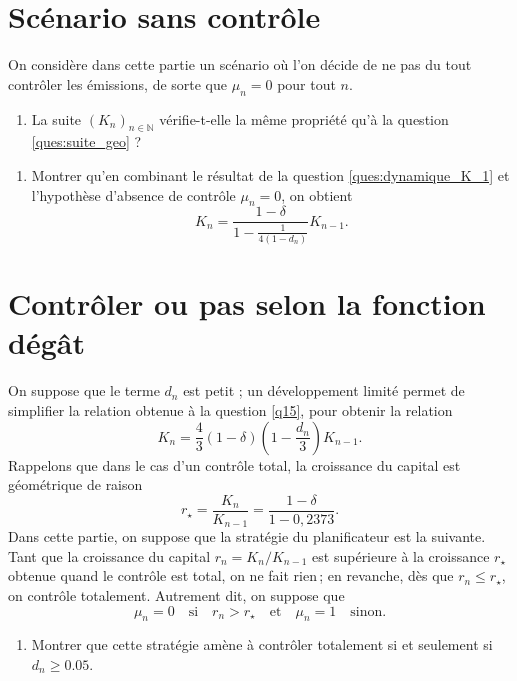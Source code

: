 \documentclass[12pt,a4paper]{article}
\newcommand{\ques}[1]{\begin{enumerate}[resume]
\item  #1
\end{enumerate}}
\newcommand{\rep}[1]{\textit{Réponse :} #1 \\}
\renewcommand{\rep}[1]{ }
\theoremstyle{remark}
\def\NN{\mathbb{N}}
\begin{document}
{\section*{\sc Scénario sans contrôle}
On considère dans cette partie un scénario où l'on décide de ne pas du tout contrôler les émissions, de sorte que $\mu_n=0$ pour tout $n$.
\ques{La suite $(K_n)_{n\in \NN}$ vérifie-t-elle la même propriété qu'à la question \ref{ques:suite_geo} ?}
\rep{Non, dans ce cas la suite $(T_n)_{n\in \NN}$, et donc la suite $(\Omega_n)_{n\in \NN}$, n'est pas constante et dépend de $(K_n)_{n\in \NN}$. La suite $(K_n)_{n\in \NN}$ n'est donc pas géométrique.}


\ques{\label{q15}Montrer qu'en combinant le résultat de la question \ref{ques:dynamique_K_1} et l'hypothèse d'absence de contrôle $\mu_n =0$, on obtient
\begin{equation*} 
K_n=\frac{1- \delta}{1- \frac{1}{4(1-d_n)}} K_{n-1}.\end{equation*}
\label{ques:dynamique_K_3}
}

\section*{\sc Contrôler ou pas selon la fonction dégât}

On suppose que le terme $d_n$ est petit ; un développement limité permet de simplifier la relation obtenue à la question \ref{q15}, pour obtenir la relation
\begin{equation*} 
K_n=\frac{4}{3}(1- \delta)\left(1-\frac{d_n}{3}\right) K_{n-1}.
\end{equation*}
Rappelons que dans le cas d'un contrôle total, la croissance du capital est géométrique de raison 
$$
r_\star = \frac{K_n}{K_{n-1}} = \frac{1- \delta}{1- 0,2373}.
$$
Dans cette partie, on suppose que la stratégie du planificateur est la suivante. Tant que la croissance du capital $r_n = K_n / K_{n-1}$ est supérieure à la croissance $r_\star$ obtenue quand le contrôle est total, on ne fait rien$\,$; en revanche, dès que $r_n \leqslant r_\star$, on contrôle totalement. Autrement dit, on suppose que
$$
 \mu_n = 0 \quad \text{si} \quad r_n > r_\star \quad \text{et} \quad \mu_n = 1 \quad \text{sinon.}
$$

\ques{Montrer que cette stratégie amène à contrôler totalement si et seulement si $d_n \geqslant 0.05.$}
\rep{On choisit de contrôler les émissions lorsque le facteur multiplicatif du scénario contrôlé est supérieur au scénario non contrôlé :
\begin{equation*}
\begin{aligned}
&(1-\delta)\frac{4}{3}\left(1-\frac{d_n}{3}\right) < \frac{1-\delta}{1-0,2373} \\
\text{ssi} \quad &1-\frac{d_n}{3} < \frac{3}{4}\times \frac{1}{0,7627} \\
\text{ssi} \quad &0,05 = 3-\frac{9}{4 \times 0,7627} < d_n
\end{aligned}
\end{equation*}
}

}
\end{document}
